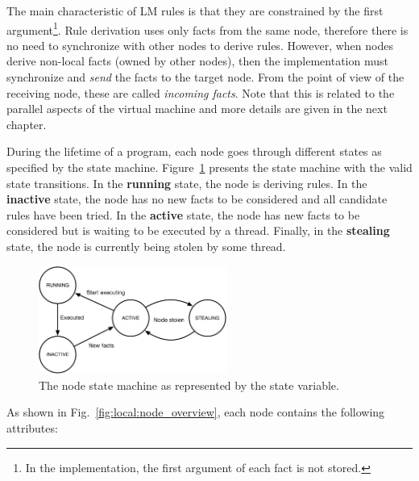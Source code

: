 The main characteristic of LM rules is that they are constrained by the first
argument\footnote{In the implementation, the first argument of each fact is not
stored.}. Rule derivation uses only facts from the same node, therefore there is
no need to synchronize with other nodes to derive rules. However, when nodes
derive non-local facts (owned by other nodes), then the implementation must
synchronize and \emph{send} the facts to the target node. From the point of view
of the receiving node, these are called \emph{incoming facts}. Note that this is related
to the parallel aspects of the virtual machine and more details are given in the
next chapter.

During the lifetime of a program, each node goes through different states as
specified by the state machine. Figure~\ref{fig:local:node_states} presents the
state machine with the valid state transitions.  In the \textbf{running} state,
the node is deriving rules. In the \textbf{inactive} state, the node has no new
facts to be considered and all candidate rules have been tried. In the
\textbf{active} state, the node has new facts to be considered but is waiting to
be executed by a thread. Finally, in the \textbf{stealing} state, the node is
currently being stolen by some thread.

\begin{figure}[ht]
   \centering
   \includegraphics[width=0.55\textwidth]{figures/local/node_state.pdf}
   \caption{The node state machine as represented by the state variable.}
   \label{fig:local:node_states}
\end{figure}

As shown in Fig.~\ref{fig:local:node_overview}, each node contains the
following attributes:

